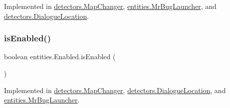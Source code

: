 Implemented in \mbox{\hyperlink{classdetectors_1_1_map_changer_af5ecc9f5fa80c769ace0b1e623d9f431}{detectors.\+Map\+Changer}}, \mbox{\hyperlink{classentities_1_1_mr_bug_launcher_ab08c44ece87cd133b59f95ab78ca9d44}{entities.\+Mr\+Bug\+Launcher}}, and \mbox{\hyperlink{classdetectors_1_1_dialogue_location_a076072001b2bba735eec60606025f9b6}{detectors.\+Dialogue\+Location}}.

\mbox{\label{interfaceentities_1_1_enabled_a3d453026138fed321aed73816b331b49}} 
\subsubsection{\texorpdfstring{is\+Enabled()}{isEnabled()}}
{\footnotesize\ttfamily boolean entities.\+Enabled.\+is\+Enabled (\begin{DoxyParamCaption}{ }\end{DoxyParamCaption})}



Implemented in \mbox{\hyperlink{classdetectors_1_1_map_changer_afea07edc6a03aef261b674c21dd9c50e}{detectors.\+Map\+Changer}}, \mbox{\hyperlink{classdetectors_1_1_dialogue_location_a7813c3b2d0b00ae7c832fef3a2b12dfc}{detectors.\+Dialogue\+Location}}, and \mbox{\hyperlink{classentities_1_1_mr_bug_launcher_a41dc8f25473307d087c9066562566059}{entities.\+Mr\+Bug\+Launcher}}.

